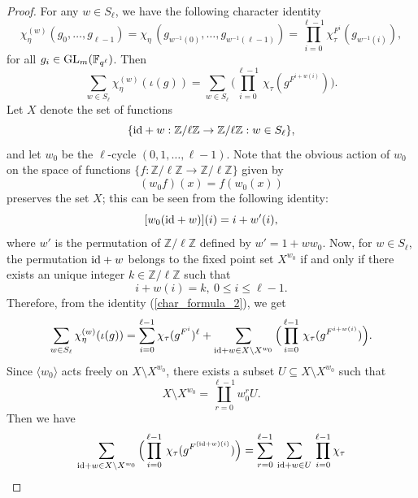 \documentclass[10pt, reqno]{amsart}
\theoremstyle{plain}
\numberwithin{equation}{section} \newcommand{\di}{\operatorname{dim}}
\begin{document}
\begin{proof}
For any $w\in S_\ell$, we have the
following character identity
$$ \chi_\eta^{(w)}(g_0,\dots,g_{\ell-1}) = 
\chi_\eta\,(g_{w^{-1}(0)},
\dots,g_{w^{-1}(\ell-1)}) = 
\prod_{i=0}^{\ell-1}\chi_\tau^{F^i}
(g_{w^{-1}(i)}), $$
for all $g_i\in {\rm GL}_m(\mathbb{F}_{q^\ell})$. 
Then
\begin{equation}\label{char_formula_2}
\sum_{w\in S_\ell} 
\chi^{(w)}_\eta(\iota(g)) = \sum_{w\in S_\ell} 
\Big(\prod_{i=0}^{\ell-1}\,
\chi_\tau(g^{F^{i+w(i)}})\Big).
\end{equation}
Let $X$ denote the set of functions
$$\{{\rm id}+w:\mathbb{Z}/\ell\mathbb{Z}\rightarrow 
\mathbb{Z}/\ell\mathbb{Z}: w\in S_\ell\},$$ and let $w_0$ be
the $\ell$-cycle $(0,1,\dots,\ell-1)$. Note that the obvious 
action of $w_0$ on the space of functions 
$\{f:\mathbb{Z}/\ell\mathbb{Z}\rightarrow 
\mathbb{Z}/\ell\mathbb{Z}\}$ given by 
$$(w_0f)(x)=f(w_0(x))$$
preserves the set $X$; this can be seen from the following identity: 
$$ [w_0 ({\rm id}+ w)](i) = 
i+w'(i),$$ where $w'$ is the permutation of 
$\mathbb{Z}/\ell\mathbb{Z}$ defined by $w'=1+ww_0$. 
Now, for $w\in S_\ell$, the permutation ${\rm id}+w$
belongs to the fixed point set $X^{w_0}$ if and only if there exists
an unique integer $k\in \mathbb{Z}/\ell\mathbb{Z}$ such that
$$ i+w(i) = k,\ 
0\leq i\leq \ell-1.$$ Therefore, from the
identity (\ref{char_formula_2}), we get
\begin{equation}\label{char_formula_3}
\sum_{w\in S_\ell} 
\chi^{(w)}_\eta(\iota(g)) = \sum_{i=0}^{\ell-1}
\chi_\tau(g^{F^i})^\ell + 
\sum_{{\rm id}+w\in X\setminus X^{w_0}}
\Big(\prod_{i=0}^{\ell-1}\,
\chi_\tau(g^{F^{i+w(i)}})\Big).
\end{equation}
Since $\langle w_0\rangle$ acts freely on $X\setminus X^{w_0}$, there
exists a subset $U\subseteq
X\setminus X^{w_0}$ such that
$$ X\setminus X^{w_0} = 
\coprod_{r=0}^{\ell-1}w_0^rU. $$
Then we have
\begin{equation}\label{char_formula_4}
\sum_{{\rm id}+w\in X\setminus X^{w_0}}\Big(\prod_{i=0}^{\ell-1}\,
\chi_\tau(g^{F^{({\rm id}+w)(i)}})\Big) =
\sum_{r=0}^{\ell-1}\,\sum_{{\rm id}+w\in U}
\,\prod_{i=0}^{\ell-1}\chi_\tau

\end{equation}
\end{proof}
\end{document}
